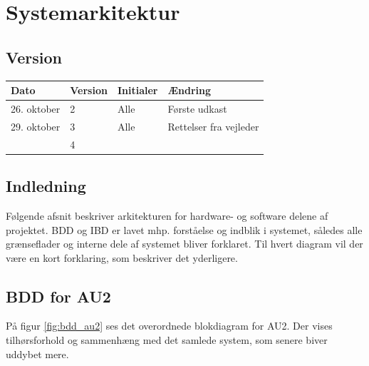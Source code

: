 \chapter{Systemarkitektur}

\section*{Version}
\begin{table}[h]
	\centering
	\begin{tabularx}{\textwidth - 2cm}{|l|l|l|X|}
	\hline
	Dato			& Version			& Initialer 		& Ændring										\\ \hline
	26. oktober		& 2 				& Alle				& Første udkast	\\ \hline
	29. oktober		& 3 				& Alle 				& Rettelser fra vejleder \\ \hline
					& 4 				&  					& 												\\ \hline
	\end{tabularx}
\end{table}

\section{Indledning}
Følgende afsnit beskriver arkitekturen for hardware- og software delene af projektet. BDD og IBD er lavet mhp. forståelse og indblik i systemet, således alle grænseflader og interne dele af systemet bliver forklaret. Til hvert diagram vil der være en kort forklaring, som beskriver det yderligere.

\clearpage

\section{BDD for AU2}	%

På figur \ref{fig:bdd_au2} ses det overordnede blokdiagram for AU2. Der vises tilhørsforhold og sammenhæng med det samlede system, som senere biver uddybet mere.

